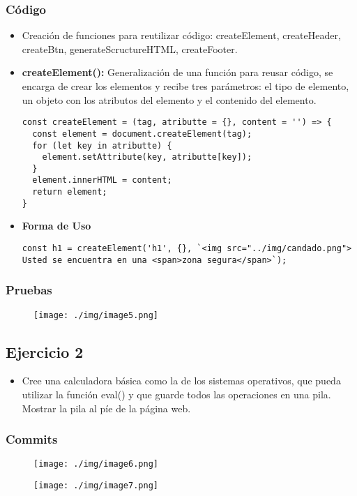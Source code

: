 \documentclass{article}
\begin{document}
\subsubsection{Código}
\begin{itemize}
\item{Creación de funciones para reutilizar código: createElement, createHeader, createBtn, generateScructureHTML, createFooter.}
\item{\textbf{createElement():} Generalización de una función para reusar código, se encarga de crear los elementos y recibe tres parámetros: el tipo de elemento, un objeto con los atributos del elemento y el contenido del elemento.}
\begin{lstlisting}[style=ascii-tree]
const createElement = (tag, atributte = {}, content = '') => {
  const element = document.createElement(tag);
  for (let key in atributte) {
    element.setAttribute(key, atributte[key]);
  }
  element.innerHTML = content;
  return element;
}
\end{lstlisting}
\item{\textbf{Forma de Uso}}
\begin{lstlisting}[style=ascii-tree]
const h1 = createElement('h1', {}, `<img src="../img/candado.png"> Usted se encuentra en una <span>zona segura</span>`);
\end{lstlisting}
\end{itemize}
\subsubsection{Pruebas}
\begin{figure}[H]
    \centering
    \texttt{[image: ./img/image5.png]}
\end{figure}




\subsection{Ejercicio 2}
\begin{itemize}
\item{Cree una calculadora básica como la de los sistemas operativos, que pueda utilizar
la función eval() y que guarde todos las operaciones en una pila. Mostrar la pila al píe de la página
web.}
\end{itemize}
\subsubsection{Commits}
\begin{figure}[H]
    \centering
    \texttt{[image: ./img/image6.png]}
\end{figure}
\begin{figure}[H]
    \centering
    \texttt{[image: ./img/image7.png]}
\end{figure}
\end{document}
